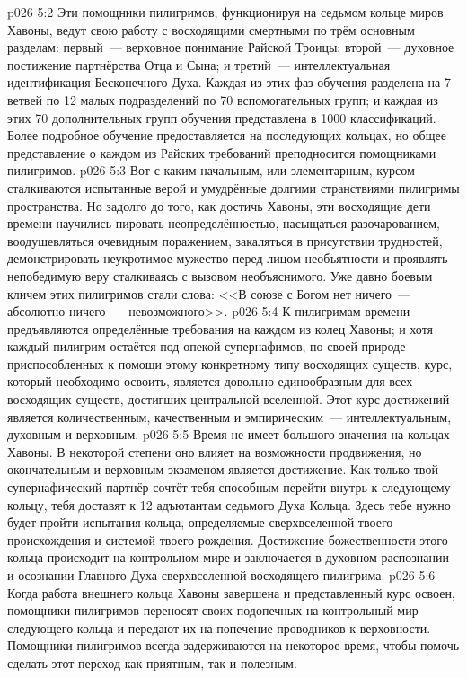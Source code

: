 \vs p026 5:2 Эти помощники пилигримов, функционируя на седьмом кольце миров Хавоны, ведут свою работу с восходящими смертными по трём основным разделам: первый~--- верховное понимание Райской Троицы; второй~--- духовное постижение партнёрства Отца и Сына; и третий~--- интеллектуальная идентификация Бесконечного Духа. Каждая из этих фаз обучения разделена на 7 ветвей по 12 малых подразделений по 70 вспомогательных групп; и каждая из этих 70 дополнительных групп обучения представлена в 1000 классификаций. Более подробное обучение предоставляется на последующих кольцах, но общее представление о каждом из Райских требований преподносится помощниками пилигримов.
\vs p026 5:3 Вот с каким начальным, или элементарным, курсом сталкиваются испытанные верой и умудрённые долгими странствиями пилигримы пространства. Но задолго до того, как достичь Хавоны, эти восходящие дети времени научились пировать неопределённостью, насыщаться разочарованием, воодушевляться очевидным поражением, закаляться в присутствии трудностей, демонстрировать неукротимое мужество перед лицом необъятности и проявлять непобедимую веру сталкиваясь с вызовом необъяснимого. Уже давно боевым кличем этих пилигримов стали слова: <<В союзе с Богом нет ничего~--- абсолютно ничего~--- невозможного>>.
\vs p026 5:4 К пилигримам времени предъявляются определённые требования на каждом из колец Хавоны; и хотя каждый пилигрим остаётся под опекой супернафимов, по своей природе приспособленных к помощи этому конкретному типу восходящих существ, курс, который необходимо освоить, является довольно единообразным для всех восходящих существ, достигших центральной вселенной. Этот курс достижений является количественным, качественным и эмпирическим~--- интеллектуальным, духовным и верховным.
\vs p026 5:5 Время не имеет большого значения на кольцах Хавоны. В некоторой степени оно влияет на возможности продвижения, но окончательным и верховным экзаменом является достижение. Как только твой супернафический партнёр сочтёт тебя способным перейти внутрь к следующему кольцу, тебя доставят к 12 адъютантам седьмого Духа Кольца. Здесь тебе нужно будет пройти испытания кольца, определяемые сверхвселенной твоего происхождения и системой твоего рождения. Достижение божественности этого кольца происходит на контрольном мире и заключается в духовном распознании и осознании Главного Духа сверхвселенной восходящего пилигрима.
\vs p026 5:6 Когда работа внешнего кольца Хавоны завершена и представленный курс освоен, помощники пилигримов переносят своих подопечных на контрольный мир следующего кольца и передают их на попечение проводников к верховности. Помощники пилигримов всегда задерживаются на некоторое время, чтобы помочь сделать этот переход как приятным, так и полезным.
